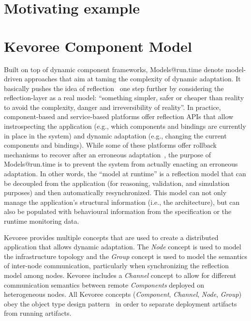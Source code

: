 \section{Motivating example}\label{sec:scapegoat-motivaing-example}



\section{Kevoree Component Model}
Built on top of dynamic component frameworks, Models@run.time denote model-driven approaches that aim at taming the complexity of dynamic adaptation.
It basically pushes the idea of reflection~\cite{morin09a} one step further by considering the reflection-layer as a real model: ``something simpler, safer or cheaper than reality to avoid the complexity, danger and irreversibility of reality''.
In practice, component-based and service-based platforms offer reflection APIs that allow instrospecting the application (e.g., which components and bindings are currently in place in the system) and dynamic adaptation (e.g., changing the current components and bindings).
While some of these platforms offer rollback mechanisms to recover after an erroneous adaptation~\cite{leger2010reliable}, the purpose of Models@run.time is to prevent the system from actually enacting an erroneous adaptation. 
In other words, the ``model at runtime'' is a reflection model that can be decoupled from the application (for reasoning, validation, and simulation purposes) and then automatically resynchronized.
This model can not only manage the application's structural information (i.e., the architecture), but can also be populated with behavioural information from the specification or the runtime monitoring data.

Kevoree provides multiple concepts that are used to create a distributed application that allows dynamic adaptation. The \emph{Node} concept is used to model the infrastructure topology and the \emph{Group} concept is used to model the semantics of inter-node communication, particularly when synchronizing the reflection model among nodes. 
Kevoree includes a \emph{Channel} concept to allow for different communication semantics between remote \emph{Components} deployed on heterogeneous nodes. 
All Kevoree concepts (\textit{Component}, \textit{Channel}, \textit{Node}, \textit{Group}) obey the object type design pattern~\cite{johnson_type_1997} in order to separate deployment artifacts from running artifacts.  

